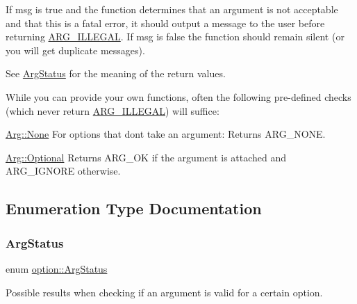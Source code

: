 If {\ttfamily msg} is {\ttfamily true} and the function determines that an argument is not acceptable and that this is a fatal error, it should output a message to the user before returning \hyperlink{namespaceoption_aee8c76a07877335762631491e7a5a1a9a9528e32563b795bd2930b12d0a5e382d}{A\+R\+G\+\_\+\+I\+L\+L\+E\+G\+AL}. If {\ttfamily msg} is {\ttfamily false} the function should remain silent (or you will get duplicate messages).

See \hyperlink{namespaceoption_aee8c76a07877335762631491e7a5a1a9}{Arg\+Status} for the meaning of the return values.

While you can provide your own functions, often the following pre-\/defined checks (which never return \hyperlink{namespaceoption_aee8c76a07877335762631491e7a5a1a9a9528e32563b795bd2930b12d0a5e382d}{A\+R\+G\+\_\+\+I\+L\+L\+E\+G\+AL}) will suffice\+:

\begin{DoxyItemize}
\item {\ttfamily \hyperlink{structoption_1_1Arg_a7fc01987899c91c6b6a1be5711a46e22}{Arg\+::\+None}} For options that don\textquotesingle{}t take an argument\+: Returns A\+R\+G\+\_\+\+N\+O\+NE. \item {\ttfamily \hyperlink{structoption_1_1Arg_aadb5316ecbc9eb0a7f0019d14bf35ad0}{Arg\+::\+Optional}} Returns A\+R\+G\+\_\+\+OK if the argument is attached and A\+R\+G\+\_\+\+I\+G\+N\+O\+RE otherwise. \end{DoxyItemize}


\subsection{Enumeration Type Documentation}
\mbox{\label{namespaceoption_aee8c76a07877335762631491e7a5a1a9}} 
\subsubsection{\texorpdfstring{Arg\+Status}{ArgStatus}}
{\footnotesize\ttfamily enum \hyperlink{namespaceoption_aee8c76a07877335762631491e7a5a1a9}{option\+::\+Arg\+Status}}



Possible results when checking if an argument is valid for a certain option. 

